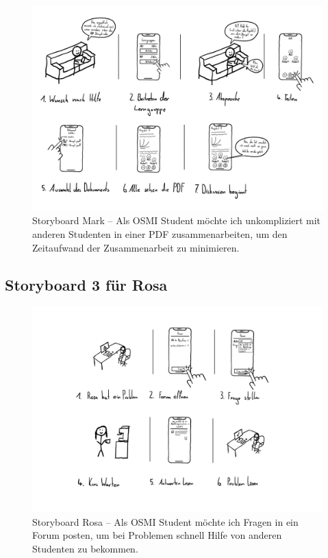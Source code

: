 \documentclass{article}
\begin{document}
\begin{landscape}
	\begin{figure}[h!]
		\includegraphics[height=0.7\textheight]{storyboard-2-mark}
		\centering
		\caption{Storyboard Mark – Als OSMI Student möchte ich unkompliziert mit anderen Studenten in einer PDF zusammenarbeiten, um den Zeitaufwand der Zusammenarbeit zu minimieren.}
	\end{figure}

	\newpage

	\subsection{Storyboard 3 für Rosa}

	\begin{figure}[h!]
		\includegraphics[height=0.7\textheight]{storyboard-3-rosa}
		\centering
		\caption{Storyboard Rosa – Als OSMI Student möchte ich Fragen in ein Forum posten, um bei Problemen schnell Hilfe von anderen Studenten zu bekommen.}
	\end{figure}


\end{landscape}
\end{document}
